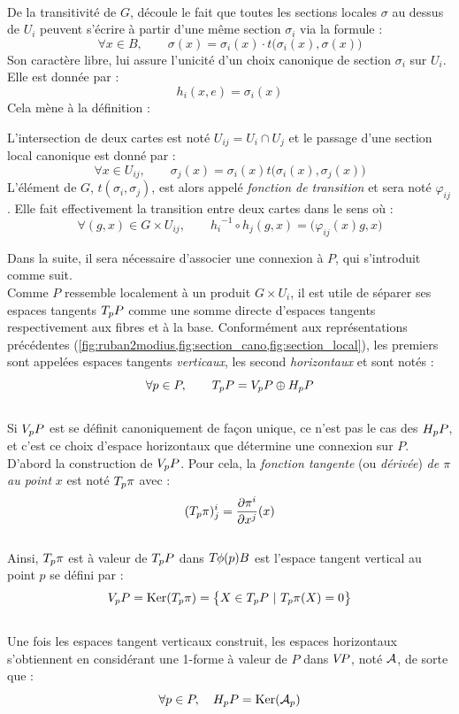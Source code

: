 \\
De la transitivité de $G$, découle le fait que toutes les sections locales $\sigma$ au dessus de $U_i$ peuvent s'écrire à partir d'une même section $\sigma_i$ via la formule :
\[\forall x\in B,\qquad \sigma(x) = \sigma_i(x) \cdot t\big(\sigma_i(x), \sigma(x)\big)\]
Son caractère libre, lui assure l'unicité d'un choix canonique de section $\sigma_i$ sur $U_i$. Elle est donnée par :
\[{h_i}(x,e) = \sigma_i(x)\]
Cela mène à la définition :
\begin{definition}
	L'intersection de deux cartes  est noté $U_{ij} = U_i\cap U_j$ et le passage d'une section local canonique est donné par :
	\[\forall x\in U_{ij},\qquad \sigma_j(x) = \sigma_i(x) t\big(\sigma_i(x), \sigma_j(x)\big)\]
	L'élément de $G$, $t(\sigma_i, \sigma_j)$, est alors appelé \emph{fonction de transition} et sera noté $\varphi_{ij}$. Elle fait effectivement la transition entre deux cartes dans le sens où :
	\[\forall (g,x)\in G\times U_{ij},\qquad {h_i}^{-1} \circ h_j(g,x) = \big( \varphi_{ij}(x)g, x \big)\]
\end{definition}
\skipl

Dans la suite, il sera nécessaire d'associer une connexion à $P$, qui s'introduit comme suit.
\\
Comme $P$ ressemble localement à un produit $G\times U_i$, il est utile de séparer ses espaces tangents $\tg[p]{P}$ comme une somme directe d'espaces tangents respectivement aux fibres et à la base. Conformément aux représentations précédentes (\cref{fig:ruban2modius,fig:section_cano,fig:section_local}), les premiers sont appelées espaces tangents \emph{verticaux}, les second \emph{horizontaux} et sont notés :
\[\forall p\in P,\qquad \tg[p]{P} = \vg[p]{P} \oplus \hg[p]{P}\]
\\
Si $\vg[p]{P}$ est se définit canoniquement de façon unique, ce n'est pas le cas des $\hg[p]{P}$, et c'est ce choix d’espace horizontaux que détermine une connexion sur $P$.\\

D'abord la construction de $\vg[p]{P}$. Pour cela, la \emph{fonction tangente} (ou \emph{dérivée}) \emph{ de $\pi$ au point} $x$ est noté $\tg[p]{\pi}$ avec :
\[(\tg[p]{\pi})^i_j = \frac{\partial \pi^i}{\partial x^j}(x)\]
\\
Ainsi, $\tg[p]{\pi}$ est à valeur de $\tg[p]{P}$ dans $\tg{\phi(p)}{B}$ est l'espace tangent vertical au point $p$ se défini par :
\[\vg[p]{P} = \Ker (\tg[p]{\pi}) = \big\{ X\in\tg[p]{P}\ |\ \tg[p]{\pi}(X)=0 \big\}\]
\\
Une fois les espaces tangent verticaux construit, les espaces horizontaux s’obtiennent en considérant une 1-forme à valeur de $P$ dans $\vg{P}$, noté $\conn$, de sorte que :
\[\forall p\in P,\quad \hg[p]{P} = \Ker(\mathcal{A}_p)\]


